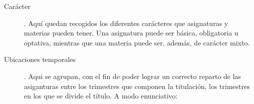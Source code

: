 \begin{description}
  
		\item [Carácter]. Aquí quedan recogidos los diferentes carácteres que asignaturas y materias pueden tener. Una asignatura puede ser básica, obligatoria u optativa, mientras que una materia puede ser, además, de carácter mixto.
		 
		 
		 
		 
  
		\item [Ubicaciones temporales]. Aqui se agrupan, con el fin de poder lograr un correcto reparto de las asiganturas entre los trimestres que componen la titulación, los trimestres en los que se divide el título. A modo enunciativo:
		 
		 

	\end{description}

